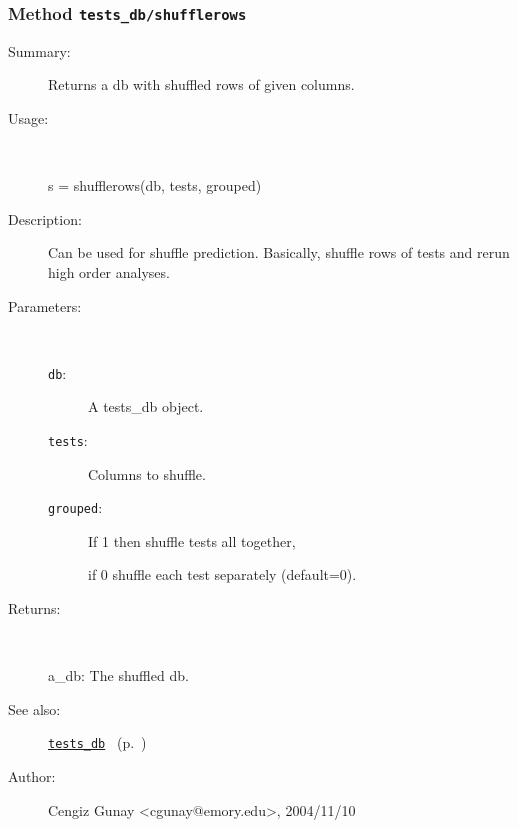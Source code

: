 \subsubsection[Method \texttt{shufflerows}]{Method \texttt{tests\_db/shufflerows}}%
%
\label{ref_tests_db__shufflerows}%
\hypertarget{ref_tests_db__shufflerows}{}%
\begin{description}
\item[Summary:]Returns a db with shuffled rows of given columns. 
%
\item[Usage:]~%
\begin{lyxcode}%
s = shufflerows(db, tests, grouped)
%
\end{lyxcode}%
%
\item[Description:]%
Can be used for shuffle prediction. Basically, shuffle rows of tests and rerun
 high order analyses. 
\item[Parameters:]~
\begin{description}%
\item[\texttt{db}:]
 A tests\_db object.
\item[\texttt{tests}:]
 Columns to shuffle.
\item[\texttt{grouped}:]
 If 1 then shuffle tests all together, 

if 0 shuffle each test separately (default=0).
\end{description}%
%
\item[Returns:
]~

	a\_db: The shuffled db.
%
%
\item[See also:]%
\hyperlink{ref_tests_db}{\texttt{tests\_db}}%
\ (p.~\pageref{ref_tests_db})%
%
%
\item[Author:]%
Cengiz Gunay <cgunay@emory.edu>, 2004/11/10
%
\end{description}
\methodline%
